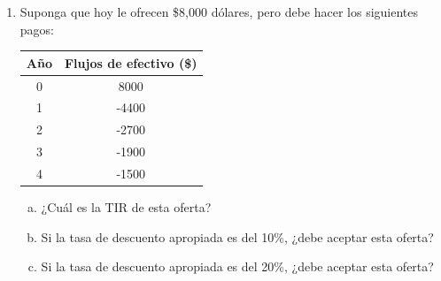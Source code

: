 \documentclass{article}
\begin{document}
\begin{enumerate}
    \begin{enumerate}[(a)]
        \item Encuentre $C$ en términos de $I$, $N$ y $R$ de tal modo que el proyecto tenga un periodo de recuperación justo igual a su vida y realice un gráfico que ilustre lo anterior.
        \item Encuentre $C$ en términos de $I$, $N$ y $R$ de tal modo que este sea un proyecto rentable de acuerdo con la regla de decisión del VPN y realice un gráfico que ilustre lo anterior.
        \item Encuentre $C$ en términos de $I$, $N$ y $R$ de tal modo que el proyecto tenga una razón del costo-beneficio de 2y realice un gráfico que ilustre lo anterior.
    \end{enumerate}
    
    \item Suponga que hoy le ofrecen \$8,000 dólares, pero debe hacer los siguientes pagos:
    
    \begin{center}
    \begin{tabular}{|c|c|}
        \hline
        Año & Flujos de efectivo (\$) \\
        \hline
        0 & 8000 \\
        1 & -4400 \\
        2 & -2700 \\
        3 & -1900 \\
        4 & -1500 \\
        \hline
    \end{tabular}
    \end{center}
    
    \begin{enumerate}[(a)]
        \item ¿Cuál es la TIR de esta oferta?
        \item Si la tasa de descuento apropiada es del 10\%, ¿debe aceptar esta oferta?
        \item Si la tasa de descuento apropiada es del 20\%, ¿debe aceptar esta oferta?
    \end{enumerate}
\end{enumerate}
\end{document}
